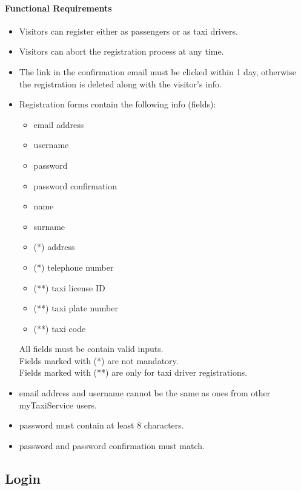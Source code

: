 \paragraph{Functional Requirements}
\begin{itemize}
	
	\item Visitors can register either as passengers or as taxi drivers.
	
	\item Visitors can abort the registration process at any time.
	
	\item The link in the confirmation email must be clicked within 1 day, otherwise the registration is deleted along with the visitor's info.
	
	\item Registration forms contain the following info (fields):
	\begin{itemize}
		\item email address
		\item username
		\item password
		\item password confirmation
		\item name
		\item surname
		\item (*) address
		\item (*) telephone number
		\item (**) taxi license ID
		\item (**) taxi plate number
		\item (**) taxi code
	\end{itemize}
	All fields must be contain valid inputs.\\
	Fields marked with (*) are not mandatory.\\
	Fields marked with (**) are only for taxi driver registrations.
	
	\item email address and username cannot be the same as ones from other myTaxiService users.
	
	\item password must contain at least 8 characters.
	
	\item password and password confirmation must match.
	
\end{itemize}

\subsection{Login}

